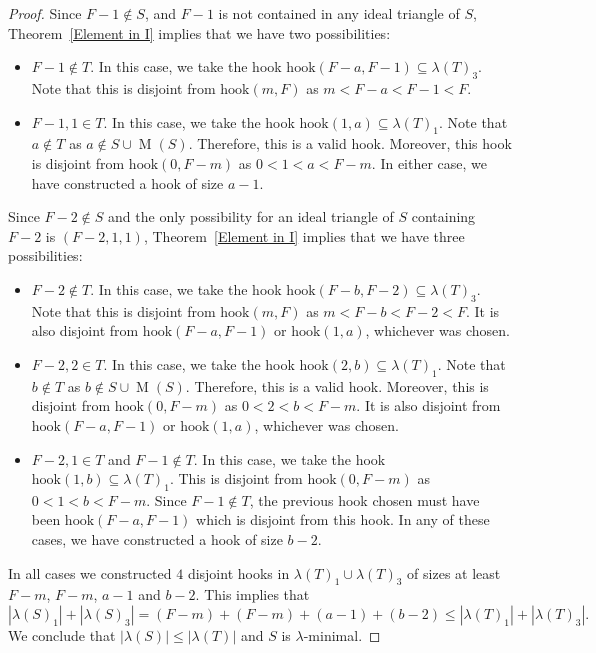 \documentclass{amsproc}
\DeclareMathOperator{\M}{M}
\newcommand{\hook}{\text{hook}}
\theoremstyle{definition}
\theoremstyle{remark}
\numberwithin{equation}{section}
\begin{document}
\begin{proof}
Since $F-1\notin S$, and $F-1$ is not contained in any ideal triangle of $S$, Theorem~\ref{Element in I} implies that we have two possibilities:
\begin{itemize}
    \item $F-1\notin T$. In this case, we take the hook $\hook(F-a,F-1)\subseteq\lambda(T)_3$. Note that this is disjoint from $\hook(m,F)$ as $m<F-a<F-1<F$.
    \item $F-1,1\in T$. In this case, we take the hook $\hook(1,a)\subseteq\lambda(T)_1$. Note that $a\notin T$ as $a\notin S\cup \M(S)$. Therefore, this is a valid hook. Moreover, this hook is disjoint from $\hook(0,F-m)$ as $0<1<a<F-m$.  In either case, we have constructed a hook of size $a-1$.
\end{itemize}

Since $F-2\notin S$ and the only possibility for an ideal triangle of $S$ containing $F-2$ is $(F-2,1,1)$, Theorem~\ref{Element in I} implies that we have three possibilities:
\begin{itemize}
    \item $F-2\notin T$. In this case, we take the hook $\hook(F-b,F-2)\subseteq\lambda(T)_3$. Note that this is disjoint from $\hook(m,F)$ as $m<F-b<F-2<F$.
    It is also disjoint from $\hook(F-a,F-1)$ or $\hook(1,a)$, whichever was chosen.
    \item $F-2,2\in T$. In this case, we take the hook $\hook(2,b)\subseteq\lambda(T)_1$. Note that $b\notin T$ as $b\notin S\cup \M(S)$. Therefore, this is a valid hook. Moreover, this is disjoint from $\hook(0,F-m)$ as $0<2<b<F-m$.
    It is also disjoint from $\hook(F-a,F-1)$ or $\hook(1,a)$, whichever was chosen.
    \item $F-2,1\in T$ and $F-1\notin T$.
    In this case, we take the hook $\hook(1,b)\subseteq\lambda(T)_1$. This is disjoint from $\hook(0,F-m)$ as $0<1<b<F-m$.
    Since $F-1\notin T$, the previous hook chosen must have been $\hook(F-a,F-1)$ which is disjoint from this hook.  In any of these cases, we have constructed a hook of size $b-2$.
\end{itemize}

In all cases we constructed $4$ disjoint hooks in $\lambda(T)_1\cup \lambda(T)_3$ of sizes at least $F-m$, $F-m$, $a-1$ and $b-2$. This implies that
\[
|\lambda(S)_1|+|\lambda(S)_3|=(F-m)+(F-m)+(a-1)+(b-2)\leq |\lambda(T)_1|+|\lambda(T)_3|.
\]
We conclude that $|\lambda(S)|\leq |\lambda(T)|$ and $S$ is $\lambda$-minimal.
\end{proof}
\end{document}
